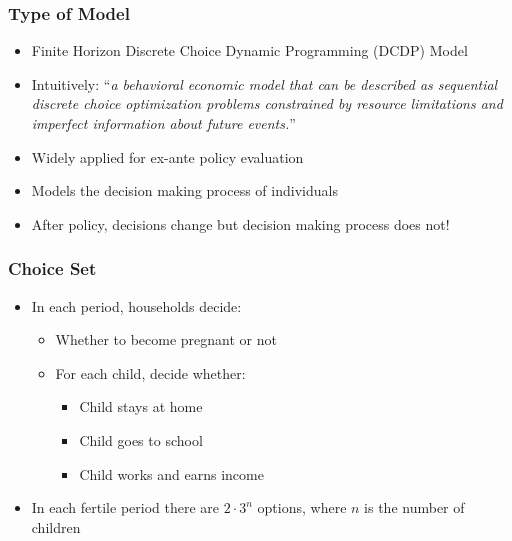 \documentclass[11pt]{beamer}
\begin{document}
\begin{frame}[c]\frametitle{Type of Model}
    \begin{itemize}
        \item Finite Horizon \alert{Discrete Choice Dynamic Programming} (DCDP) Model
        \item \alert{Intuitively}: ``\textit{\small{a behavioral economic model that can be described as sequential discrete choice optimization problems constrained by resource limitations and imperfect information about future events.}}''
        \item Widely applied for ex-ante policy evaluation
        \item Models the decision making process of individuals
        \item After policy, decisions change but decision making process does not!
    \end{itemize}
\end{frame}



\begin{frame}[c]\frametitle{Choice Set}
    \begin{itemize}
        \item In each period, households decide:
        \begin{itemize}
            \item Whether to become pregnant or not
            \item For each child, decide whether:
            \begin{itemize}
                \item Child stays at home
                \item Child goes to school
                \item Child works and earns income
            \end{itemize}
        \end{itemize}
        \item In each fertile period there are $2 \cdot 3^{n}$ options, where $n$ is the number of children
    \end{itemize}
\end{frame}
\end{document}
